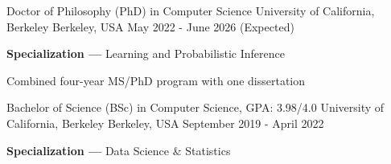 
\begin{cventries}
  \cventry
    {Doctor of Philosophy (PhD) in Computer Science} %
    {University of California, Berkeley} %
    {Berkeley, USA} %
    {May 2022 - June 2026 (Expected)} %
    {
      \begin{cvitems}
        \item {\textbf{Specialization ---} Learning and Probabilistic Inference}
        \item {Combined four-year MS/PhD program with one dissertation}
      \end{cvitems}
      }
    
  \cventry
    {Bachelor of Science (BSc) in Computer Science, GPA: 3.98/4.0} %
    {University of California, Berkeley} %
    {Berkeley, USA} %
    {September 2019 - April 2022} %
    {
      \begin{cvitems} %
         \item {\textbf{Specialization ---} Data Science \& Statistics}
      \end{cvitems}
    }
\end{cventries}
